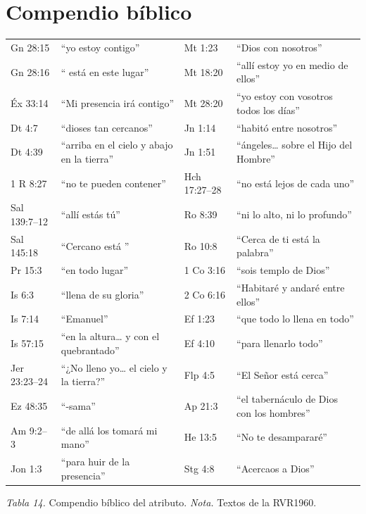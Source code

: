\section*{Compendio bíblico}
\begin{center}\small\renewcommand{\arraystretch}{1.12}
\begin{tabular}{@{}L{2.2cm}L{5.0cm}|L{2.2cm}L{5.0cm}@{}}
\toprule
Gn 28:15 & ``yo estoy contigo'' & Mt 1:23 & ``Dios con nosotros'' \\
Gn 28:16 & ``\SENOR{} está en este lugar'' & Mt 18:20 & ``allí estoy yo en medio de ellos'' \\
Éx 33:14 & ``Mi presencia irá contigo'' & Mt 28:20 & ``yo estoy con vosotros todos los días'' \\
Dt 4:7 & ``dioses tan cercanos'' & Jn 1:14 & ``habitó entre nosotros'' \\
Dt 4:39 & ``arriba en el cielo y abajo en la tierra'' & Jn 1:51 & ``ángeles\ldots{} sobre el Hijo del Hombre'' \\
1 R 8:27 & ``no te pueden contener'' & Hch 17:27--28 & ``no está lejos de cada uno'' \\
Sal 139:7--12 & ``allí estás tú'' & Ro 8:39 & ``ni lo alto, ni lo profundo'' \\
Sal 145:18 & ``Cercano está \SENOR{}'' & Ro 10:8 & ``Cerca de ti está la palabra'' \\
Pr 15:3 & ``en todo lugar'' & 1 Co 3:16 & ``sois templo de Dios'' \\
Is 6:3 & ``llena de su gloria'' & 2 Co 6:16 & ``Habitaré y andaré entre ellos'' \\
Is 7:14 & ``Emanuel'' & Ef 1:23 & ``que todo lo llena en todo'' \\
Is 57:15 & ``en la altura\ldots{} y con el quebrantado'' & Ef 4:10 & ``para llenarlo todo'' \\
Jer 23:23--24 & ``¿No lleno yo\ldots{} el cielo y la tierra?'' & Flp 4:5 & ``El Señor está cerca'' \\
Ez 48:35 & ``\SENOR{}-sama'' & Ap 21:3 & ``el tabernáculo de Dios con los hombres'' \\
Am 9:2--3 & ``de allá los tomará mi mano'' & He 13:5 & ``No te desampararé'' \\
Jon 1:3 & ``para huir de la presencia'' & Stg 4:8 & ``Acercaos a Dios'' \\
\bottomrule
\end{tabular}\par
{\footnotesize\color{gris}\textit{Tabla 14.} Compendio bíblico del atributo. \textit{Nota.} Textos de la RVR1960.}
\end{center}

